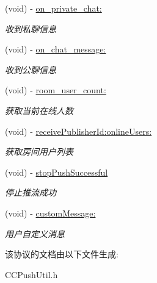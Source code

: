 \begin{DoxyCompactItemize}
\mbox{\label{protocol_c_c_push_util_delegate_01-p_a08b40a10250ad192aa54dc7ce80d100e}} 
(void) -\/ \hyperlink{protocol_c_c_push_util_delegate_01-p_a08b40a10250ad192aa54dc7ce80d100e}{on\+\_\+private\+\_\+chat\+:}
\begin{DoxyCompactList}\small\item\em 收到私聊信息 \end{DoxyCompactList}\item 
\mbox{\label{protocol_c_c_push_util_delegate_01-p_aec14126f4a940b90241b417dd142c5ca}} 
(void) -\/ \hyperlink{protocol_c_c_push_util_delegate_01-p_aec14126f4a940b90241b417dd142c5ca}{on\+\_\+chat\+\_\+message\+:}
\begin{DoxyCompactList}\small\item\em 收到公聊信息 \end{DoxyCompactList}\item 
\mbox{\label{protocol_c_c_push_util_delegate_01-p_a70508a1bbd73495584a45887d6871c6b}} 
(void) -\/ \hyperlink{protocol_c_c_push_util_delegate_01-p_a70508a1bbd73495584a45887d6871c6b}{room\+\_\+user\+\_\+count\+:}
\begin{DoxyCompactList}\small\item\em 获取当前在线人数 \end{DoxyCompactList}\item 
\mbox{\label{protocol_c_c_push_util_delegate_01-p_acc3ef3eb53eef99e8271da1d44bb5d3b}} 
(void) -\/ \hyperlink{protocol_c_c_push_util_delegate_01-p_acc3ef3eb53eef99e8271da1d44bb5d3b}{receive\+Publisher\+Id\+:online\+Users\+:}
\begin{DoxyCompactList}\small\item\em 获取房间用户列表 \end{DoxyCompactList}\item 
\mbox{\label{protocol_c_c_push_util_delegate_01-p_af64a29602fad3c4385c59a4db2d9f5b3}} 
(void) -\/ \hyperlink{protocol_c_c_push_util_delegate_01-p_af64a29602fad3c4385c59a4db2d9f5b3}{stop\+Push\+Successful}
\begin{DoxyCompactList}\small\item\em 停止推流成功 \end{DoxyCompactList}\item 
\mbox{\label{protocol_c_c_push_util_delegate_01-p_ab73312f335d91ce6341ebedefead819d}} 
(void) -\/ \hyperlink{protocol_c_c_push_util_delegate_01-p_ab73312f335d91ce6341ebedefead819d}{custom\+Message\+:}
\begin{DoxyCompactList}\small\item\em 用户自定义消息 \end{DoxyCompactList}\end{DoxyCompactItemize}


该协议的文档由以下文件生成\+:\begin{DoxyCompactItemize}
\item 
C\+C\+Push\+Util.\+h\end{DoxyCompactItemize}
